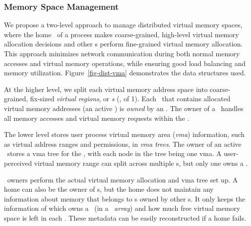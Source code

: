 \subsubsection{Memory Space Management}
We propose a two-level approach to manage distributed virtual memory spaces,
where the home \mcomponent\ of a process makes coarse-grained, high-level virtual memory allocation decisions
and other \mcomponent{}s perform fine-grained virtual memory allocation.
This approach minimizes network communication during both normal memory accesses and virtual memory operations,
while ensuring good load balancing and memory utilization.
Figure~\ref{fig-dist-vma} demonstrates the data structures used. %

At the higher level, we split each virtual memory address space into coarse-grained, fix-sized {\em virtual regions},
or {\em \vregion{}s} (\eg, of 1\GB).
Each \vregion\ that contains allocated virtual memory addresses (an active \vregion) is {\em owned} by an \mcomponent{}.
The owner of a \vregion\ handles all memory accesses and virtual memory requests within the \vregion.


The lower level stores user process virtual memory area ({\em vma}) information,
such as virtual address ranges and permissions, in {\em vma trees}.
The owner of an active \vregion\ stores a vma tree for the \vregion,
with each node in the tree being one vma.
A user-perceived virtual memory range can split across multiple \mcomponent{}s,
but only one \mcomponent{} owns a \vregion.

\vregion\ owners perform the actual virtual memory allocation and vma tree set up.
A home \mcomponent{} can also be the owner of \vregion{}s,
but the home \mcomponent{} does not maintain any information about memory that belongs to \vregion{}s owned by other \mcomponent{}s.
It only keeps the information of which \mcomponent{} owns a \vregion\ (in a {\em \vregion\ array})
and how much free virtual memory space is left in each \vregion.
These metadata can be easily reconstructed if a home \mcomponent{} fails.


